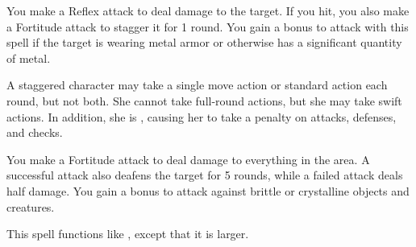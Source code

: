 \begin{spelleffect}
    You make a Reflex attack to deal damage to the target. If you hit, you also make a Fortitude attack to stagger it for 1 round. You gain a  bonus to attack with this spell if the target is wearing metal armor or otherwise has a significant quantity of metal.
\end{spelleffect}
\begin{spellnotes}
    A staggered character may take a single move action or standard action each round, but not both. She cannot take full-round actions, but she may take swift actions. In addition, she is \vulnerable, causing her to take a  penalty on attacks, defenses, and checks.
\end{spellnotes}

\begin{spelleffect}
    You make a Fortitude attack to deal damage to everything in the area. A successful attack also deafens the target for 5 rounds, while a failed attack deals half damage. You gain a  bonus to attack against brittle or crystalline objects and creatures.
\end{spelleffect}

\begin{spelleffect}
    This spell functions like , except that it is larger.
\end{spelleffect}

